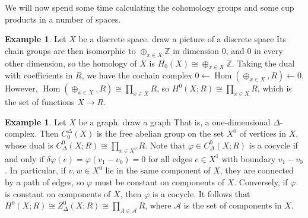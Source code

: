 \documentclass{book}
\newcommand{\scrA}{\mathscr{A}}
\newcommand{\bbZ}{\mathbb{Z}}
\renewcommand{\phi}{\varphi}
\DeclareMathOperator{\Hom}{Hom}
\theoremstyle{definition}
\newtheorem{example}[theorem]{Example}
\theoremstyle{remark}
\numberwithin{equation}{section}
\begin{document}
We will now spend some time calculating the cohomology groups and some cup products in a number of spaces.
\begin{example}
    Let $X$ be a discrete space. {\color{red} draw a picture of a discrete space} Its chain groups are then isomorphic to $\oplus_{x \in X} \bbZ$ in dimension $0$, and $0$ in every other dimension, so the homology of $X$ is $H_0(X) \cong \oplus_{x \in X} \bbZ$. Taking the dual with coefficients in $R$, we have the cochain complex $0 \leftarrow \Hom(\oplus_{x \in X}, R) \leftarrow 0$. However, $\Hom(\oplus_{x \in X}, R) \cong \prod_{x \in X} R$, so $H^0(X;R) \cong \prod_{x \in X} R$, which is the set of functions $X \to R$.
\end{example}
\begin{example} \label{eg:graphs}
    Let $X$ be a graph. {\color{red} draw a graph} That is, a one-dimensional $\Delta$-complex. Then $C_0^\Delta(X)$ is the free abelian group on the set $X^0$ of vertices in $X$, whose dual is $C^0_\Delta(X;R) \cong \prod_{x \in X^0} R$. Note that $\phi \in C^0_\Delta(X;R)$ is a cocycle if and only if $\delta\phi(e) = \phi(v_1 - v_0) = 0$ for all edges $e \in X^1$ with boundary $v_1 - v_0$. In particular, if $v, w \in X^0$ lie in the same component of $X$, they are connected by a path of edges, so $\phi$ must be constant on components of $X$. Conversely, if $\phi$ is constant on components of $X$, then $\phi$ is a cocycle. It follows that $H^0(X;R) \cong Z^0_\Delta(X;R) \cong \prod_{A \in \scrA} R$, where $\scrA$ is the set of components in $X$.


\end{example}
\end{document}
